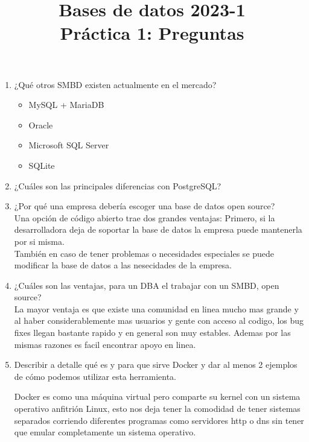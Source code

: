 \documentclass[12pt,a4paper]{article}
\title{Bases de datos 2023-1\\
Práctica 1: Preguntas}
\begin{document}
\maketitle

\begin{enumerate}
	\item ¿Qué otros SMBD existen actualmente en el mercado?\\
		\begin{itemize}
			\item MySQL + MariaDB
			\item Oracle
			\item Microsoft SQL Server
			\item SQLite
		\end{itemize}

	\item ¿Cuáles son las principales diferencias con PostgreSQL?\\

	\item ¿Por qué una empresa debería escoger una base de datos open source?\\
		Una opción de código abierto trae dos grandes ventajas:
		Primero, si la desarrolladora deja de soportar la base de datos la empresa
		puede mantenerla por si misma.\\
		También en caso de tener problemas o necesidades especiales se puede
		modificar la base de datos a las nesecidades de la empresa.\\

	\item ¿Cuáles son las ventajas, para un DBA el trabajar con un SMBD, open source?\\

		La mayor ventaja es que existe una comunidad en linea mucho mas grande y al haber
		considerablemente mas usuarios y gente con acceso al codigo, los bug fixes llegan bastante rapido
		y en general son muy estables. Ademas por las mismas razones es facil encontrar apoyo en linea.

	\item Describir a detalle qué es y para que sirve Docker y dar al menos 2 ejemplos\\
		de cómo podemos utilizar esta herramienta.

		Docker es como una máquina virtual pero comparte su kernel con un sistema operativo
		anfitrión Linux, esto nos deja tener la comodidad de tener sistemas separados
		corriendo diferentes programas como servidores http o dns sin tener que emular
		completamente un sistema operativo.\\


\end{enumerate}
\end{document}

